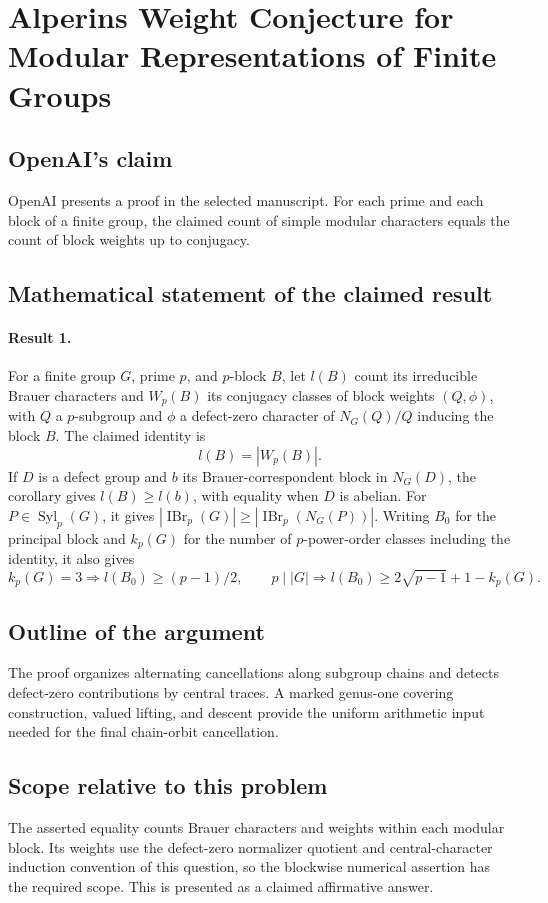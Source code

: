 \documentclass[11pt]{article}
\begin{document}
\section*{Alperins Weight Conjecture for Modular Representations of Finite Groups}

\subsection{OpenAI's claim}
OpenAI presents a proof in the selected manuscript. For each prime and each block of a finite group, the claimed count of simple modular characters equals the count of block weights up to conjugacy.

\subsection{Mathematical statement of the claimed result}
\paragraph{Result 1.} For a finite group \(G\), prime \(p\), and \(p\)-block \(B\), let \(l(B)\) count its irreducible Brauer characters and \(W_p(B)\) its conjugacy classes of block weights \((Q,\phi)\), with \(Q\) a \(p\)-subgroup and \(\phi\) a defect-zero character of \(N_G(Q)/Q\) inducing the block \(B\). The claimed identity is
\[
 l(B)=|W_p(B)|.
\]
If \(D\) is a defect group and \(b\) its Brauer-correspondent block in \(N_G(D)\), the corollary gives \(l(B)\ge l(b)\), with equality when \(D\) is abelian. For \(P\in\operatorname{Syl}_p(G)\), it gives \(|\operatorname{IBr}_p(G)|\ge|\operatorname{IBr}_p(N_G(P))|\). Writing \(B_0\) for the principal block and \(k_p(G)\) for the number of \(p\)-power-order classes including the identity, it also gives
\[
 k_p(G)=3\Rightarrow l(B_0)\ge(p-1)/2,\qquad
 p\mid|G|\Rightarrow l(B_0)\ge2\sqrt{p-1}+1-k_p(G).
\]

\subsection{Outline of the argument}
The proof organizes alternating cancellations along subgroup chains and detects defect-zero contributions by central traces. A marked genus-one covering construction, valued lifting, and descent provide the uniform arithmetic input needed for the final chain-orbit cancellation.

\subsection{Scope relative to this problem}
The asserted equality counts Brauer characters and weights within each modular block. Its weights use the defect-zero normalizer quotient and central-character induction convention of this question, so the blockwise numerical assertion has the required scope. This is presented as a claimed affirmative answer.
\end{document}
